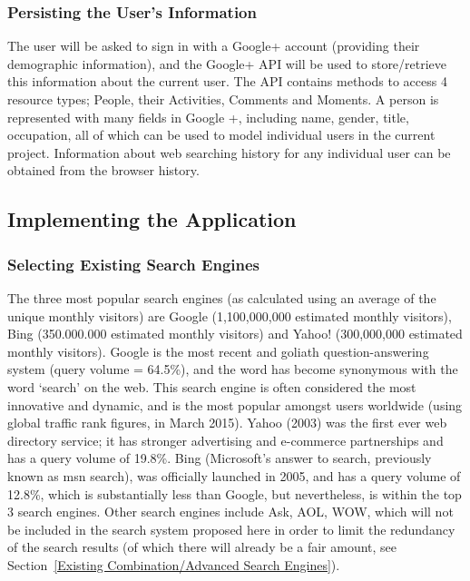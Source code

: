 \documentclass[10pt]{article}
\begin{document}
\subsubsection{Persisting the User's Information}
The user will be asked to sign in with a Google+ account (providing their demographic information), and the Google+ API will be used to store/retrieve this information about the current user. The API contains methods to access 4 resource  types; People, their Activities, Comments and Moments. A person is represented with many fields in Google +, including name, gender, title, occupation, all of which can be used to model individual users in the current project. Information about web searching history for any individual user can be obtained from the browser history. 





\subsection{Implementing the Application}\label{api}
\subsubsection{Selecting Existing Search Engines} 
The three most popular search engines (as calculated using an average of the unique monthly visitors) are Google (1,100,000,000 estimated monthly visitors), Bing (350.000.000 estimated monthly visitors) and Yahoo! (300,000,000 estimated monthly visitors)\cite{ebiz}. Google is the most recent and goliath question-answering system (query volume = 64.5\%)\cite{adam}, and the word has become synonymous with the word ‘search’ on the web. This search engine is often considered the most innovative and dynamic, and is the most popular amongst users worldwide (using global traffic rank figures, in March 2015). Yahoo (2003) was the first ever web directory service; it has stronger advertising and e-commerce partnerships and has a query volume of 19.8\%. Bing (Microsoft's answer to search, previously known as msn search), was officially launched in 2005, and has a query volume of 12.8\%, which is substantially less than Google, but nevertheless, is within the top 3 search engines. Other search engines include Ask, AOL, WOW, which will not be included in the search system proposed here in order to limit the redundancy of the search results (of which there will already be a fair amount, see Section~\ref{Existing Combination/Advanced Search Engines}). 
\end{document}
